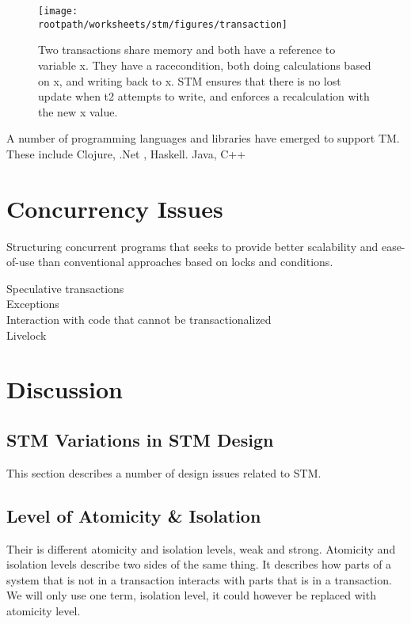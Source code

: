 \begin{figure}[h!]
\centering
\texttt{[image: \\rootpath/worksheets/stm/figures/transaction]}
\caption{Two transactions share memory and both have a reference to variable x. They have a racecondition, both doing calculations based on x, and writing back to x. \ac{STM} ensures that there is no lost update when t2 attempts to write, and enforces a recalculation with the new x value.}\label{fig:transaction}
\end{figure}

A number of programming languages and libraries have emerged to support TM. These include Clojure, .Net , Haskell. Java, C++\\

\section{Concurrency Issues}
\label{sec:stm_issues}
Structuring concurrent programs that seeks to provide better scalability and ease-of-use than conventional approaches based on locks and conditions.

Speculative transactions\\
Exceptions\\
Interaction with code that cannot be transactionalized\\
Livelock\\
\section{Discussion}
\label{sec:stm_discussion}
\subsection{\ac{STM} Variations in \ac{STM} Design}
This section describes a number of design issues related to \ac{STM}.
\subsection{Level of Atomicity \& Isolation}
\label{subsec:isolation_level}
Their is different atomicity and isolation levels, weak and strong. Atomicity and isolation levels describe two sides of the same thing. It describes how parts of a system that is not in a transaction interacts with parts that is in a transaction. We will only use one term, isolation level, it could however be replaced with atomicity level.

